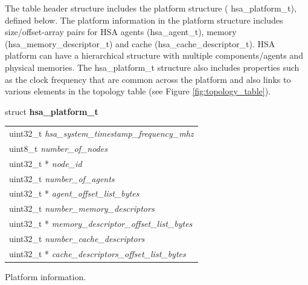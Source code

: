 \documentclass{book}
\newcommand{\hsaarg}[1]{\textit{#1}}
\newcommand{\hsadef}[2]{\hypertarget{#1}{\textbf{#2}}}
\newcommand{\reftyp}[1]{#1}
\begin{document}
 

The table header structure includes the platform structure (
\reftyp{hsa\_platform\_t}), defined below.  The platform information in
the platform structure includes size/offset-array pairs for HSA agents
(\reftyp{hsa\_agent\_t}), memory (\reftyp{hsa\_memory\_descriptor\_t}) and
cache (\reftyp{hsa\_cache\_descriptor\_t}).  HSA platform can have a
hierarchical structure with multiple components/agents and physical
memories.  The \reftyp{hsa\_platform\_t} structure also includes
properties such as the clock frequency that are common across the
platform and also links to various elements in the topology table (see
Figure \ref{fig:topology_table}).

\makeatletter{}

\noindent\begin{tcolorbox}[nobeforeafter,arc=0mm,colframe=white,colback=lightgray,left=0mm]
struct \hsadef{group__STR__platform_1gac15087b44d735fd1479fc754de556a00}{hsa\_platform\_t} \\
\begin{tabular}{@{}l}
\hspace{1.7em}uint32\_t \hsaarg{hsa\_system\_timestamp\_frequency\_mhz}\\
\hspace{1.7em}uint8\_t \hsaarg{number\_of\_nodes}\\
\hspace{1.7em}uint32\_t * \hsaarg{node\_id}\\
\hspace{1.7em}uint32\_t \hsaarg{number\_of\_agents}\\
\hspace{1.7em}uint32\_t * \hsaarg{agent\_offset\_list\_bytes}\\
\hspace{1.7em}uint32\_t \hsaarg{number\_memory\_descriptors}\\
\hspace{1.7em}uint32\_t * \hsaarg{memory\_descriptor\_offset\_list\_bytes}\\
\hspace{1.7em}uint32\_t \hsaarg{number\_cache\_descriptors}\\
\hspace{1.7em}uint32\_t * \hsaarg{cache\_descriptors\_offset\_list\_bytes}
\end{tabular}

\end{tcolorbox}
Platform information.
\end{document}
